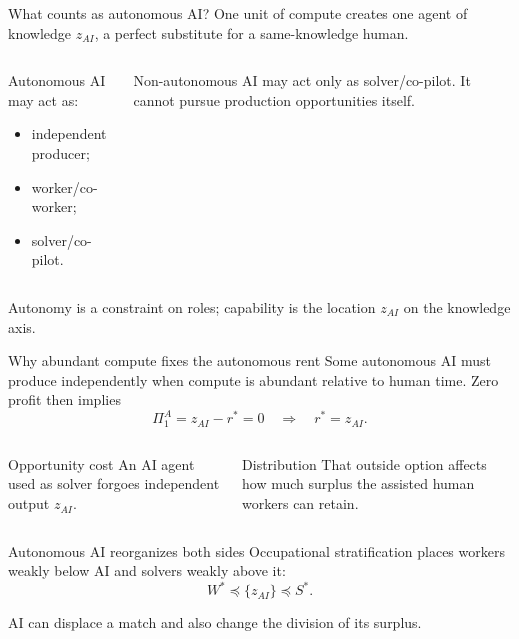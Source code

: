 \documentclass[aspectratio=169,10pt]{beamer}
\begin{document}
\begin{frame}{What counts as autonomous AI?}
\small
One unit of compute creates one agent of knowledge $z_{AI}$, a perfect substitute for a same-knowledge human.
\vspace{.3cm}
\begin{columns}[T,onlytextwidth]
\begin{block}{Autonomous}
AI may act as:
\begin{itemize}
\item independent producer;
\item worker/co-worker;
\item solver/co-pilot.
\end{itemize}
\end{block}
\begin{alertblock}{Non-autonomous}
AI may act only as solver/co-pilot. It cannot pursue production opportunities itself.
\end{alertblock}
\end{columns}
\vfill
Autonomy is a constraint on roles; capability is the location $z_{AI}$ on the knowledge axis.
\end{frame}

\begin{frame}{Why abundant compute fixes the autonomous rent}
\small
Some autonomous AI must produce independently when compute is abundant relative to human time. Zero profit then implies
\[
\Pi_1^A=z_{AI}-r^*=0
\quad\Longrightarrow\quad
\boxed{r^*=z_{AI}}.
\]
\begin{columns}[T,onlytextwidth]
\begin{block}{Opportunity cost}
An AI agent used as solver forgoes independent output $z_{AI}$.
\end{block}
\begin{alertblock}{Distribution}
That outside option affects how much surplus the assisted human workers can retain.
\end{alertblock}
\end{columns}
\end{frame}

\begin{frame}{Autonomous AI reorganizes both sides}
\small
Occupational stratification places workers weakly below AI and solvers weakly above it:
\[
W^*\preceq\{z_{AI}\}\preceq S^*.
\]
\begin{center}
\end{center}
AI can displace a match and also change the division of its surplus.
\end{frame}
\end{document}
